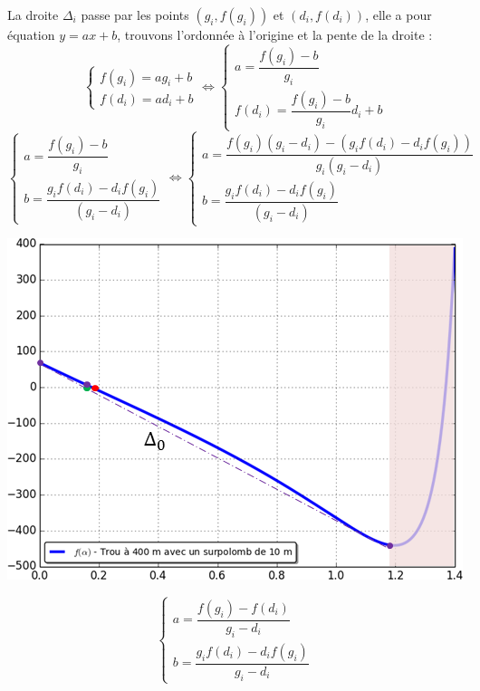 \documentclass[10pt,fleqn]{article} %
\begin{document}
\ifprof
\begin{minipage}[c]{.49\linewidth}
La droite $\Delta_i$ passe par les points $(g_i,f(g_i))$ et $(d_i,f(d_i))$, elle a pour équation $y=ax + b$, trouvons l'ordonnée à l'origine et la pente de la droite :
$$
\left\{
\begin{array}{l}
f(g_i) = a g_i + b \\
f(d_i) = a d_i + b 
\end{array}
\right.
\Longleftrightarrow
\left\{
\begin{array}{l}
a = \dfrac{f(g_i)-b}{g_i} \\
f(d_i) =  \dfrac{f(g_i)-b}{g_i}d_i + b 
\end{array}
\right.
$$ 
$$
\left\{
\begin{array}{l}
a = \dfrac{f(g_i)-b}{g_i} \\
b = \dfrac{g_i f(d_i) -d_if(g_i) }{(g_i  -d_i)}
\end{array}
\right.
\Longleftrightarrow
\left\{
\begin{array}{l}
a = \dfrac{f(g_i)(g_i  -d_i)- (g_i f(d_i) -d_if(g_i) )}{g_i(g_i-d_i)} \\
b = \dfrac{g_i f(d_i) -d_if(g_i) }{(g_i  -d_i)}
\end{array}
\right.
$$ 
\end{minipage} \hfill
\begin{minipage}[c]{.43\linewidth}
\begin{center}
\includegraphics[width=.9\textwidth]{images/InterpretationG2}
\end{center}
\end{minipage}
\vspace{.25cm}

$$
\left\{
\begin{array}{l}
a = \dfrac{f(g_i)  -  f(d_i)  }{g_i-d_i} \\
b = \dfrac{g_i f(d_i) -d_if(g_i) }{g_i  -d_i}
\end{array}
\right.
$$ 
\end{document}
